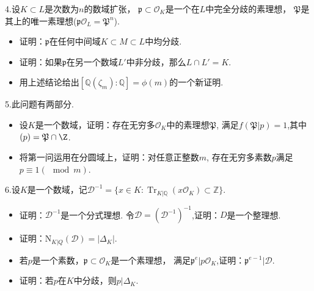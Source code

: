 4.设$K\subset L$是次数为$n$的数域扩张，
$\mathfrak{p}\subset \mathcal{O}_K$是一个在$L$中完全分歧的素理想，
$\mathfrak{P}$是其上的唯一素理想($\mathfrak{p}\mathcal{O}_L=\mathfrak{P}^n$).
\begin{itemize}
    \item 证明：$\mathfrak{p}$在任何中间域$K\subset M\subset L$中均分歧.
    \item 证明：如果$\mathfrak{p}$在另一个数域$L'$中非分歧，那么$L\cap L'=K$.
    \item 用上述结论给出$[\mathbb{Q}(\zeta_m):\mathbb{Q}]=\phi(m)$的一个新证明.
\end{itemize}
5.此问题有两部分.
\begin{itemize}
\item 设$K$是一个数域，证明：存在无穷多$\mathcal{O}_K$中的素理想$\mathfrak{P}$,
满足$f(\mathfrak{P}|p)=1$,其中$(p)=\mathfrak{P}\cap\Z$.
\item 将第一问运用在分圆域上，证明：对任意正整数$m$,
存在无穷多素数$p$满足$p\equiv 1(\mod m)$.
\end{itemize}
6.设$K$是一个数域，记$\mathcal{D}^{-1}=\{x\in K:\operatorname{Tr}_{K|\mathbb{Q}}(x\mathcal{O}_K)\subset\mathbb{Z}\}$.
\begin{itemize}
    \item 证明：$\mathcal{D}^{-1}$是一个分式理想.
    令$\mathcal{D}=(\mathcal{D}^{-1})^{-1}$,证明：$D$是一个整理想.
    \item 证明：$\mathrm{N}_{K|Q}(\mathcal{D})=|\Delta_K|$.
    \item 若$p$是一个素数，$\mathfrak{p}\subset\mathcal{O}_K$是一个素理想，
    满足$\mathfrak{p}^e|p\mathcal{O}_K$,证明：$\mathfrak{p}^{e-1}|\mathcal{D}$.
    \item 证明：若$p$在$K$中分歧，则$p|\Delta_K$.
\end{itemize}